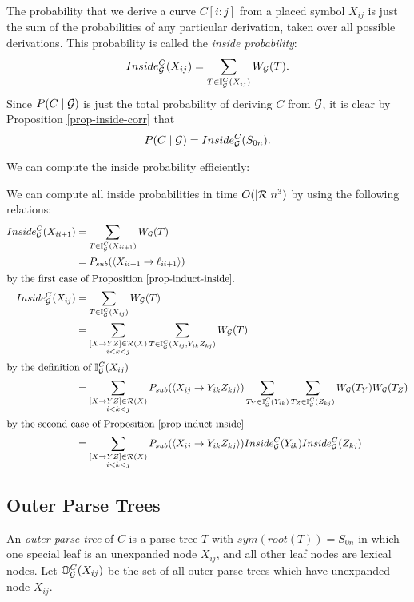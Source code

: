 \documentclass{article}
\newcommand\Inner{\mathbb{I}}
\newcommand\Outer{\mathbb{O}}
\begin{document}
The probability that we derive a curve $C[i:j]$ from a placed symbol
$X_{ij}$ is just the sum of the probabilities of any particular
derivation, taken over all possible derivations. This probability is
called the \emph{inside probability}:
$$Inside_\GGG^C(X_{i j}) =  \sum_{T\in \Inner_\GGG^C(X_{ij})}W_\GGG(T).$$
Since $P(C\mid {\mathcal G})$ is just the total probability of deriving $C$
from ${\mathcal G}$, it is clear by Proposition \ref{prop-inside-corr} that 
$$P(C\mid {\mathcal G}) = Inside_{{\mathcal G}}^C(S_{0 n}).$$

We can compute the inside probability efficiently:

\begin{obs}
\label{obs-inside-rec}
We can compute all inside probabilities in time $O(|{\mathcal R}|n^3)$ by using the
following relations:
  \begin{align*}
Inside_\GGG^C(X_{i i+1}) &= \sum_{T\in \Inner_\GGG^C(X_{i i+1})}
W_\GGG(T)\\
 &= P_{sub}(\langle X_{i i+1} \to \ell_{i i+1} \rangle) \\
\intertext{by the first case of Proposition \ref{prop-induct-inside}.}
Inside_\GGG^C(X_{ij}) &= \sum_{T\in \Inner_\GGG^C(X_{ij})} W_\GGG(T)\\
&= \sum_{\substack{[X\to YZ] \in \RRR(X)\\ i < k < j}} \sum_{T\in
  \Inner_\GGG^C(X_{ij}, Y_{ik}Z_{kj})} W_\GGG(T)\\
\intertext{by the definition of $\Inner_\GGG^C(X_{ij})$}
&= \sum_{\substack{[X\to YZ] \in \RRR(X)\\ i < k < j}} 
P_{sub}(\langle X_{ij} \to Y_{ik} Z_{kj} \rangle)
\sum_{T_Y\in \Inner_\GGG^C(Y_{ik})}
\sum_{T_Z\in \Inner_\GGG^C(Z_{kj})}
 W_\GGG(T_Y) W_\GGG(T_Z)\\
\intertext{by the second case of Proposition \ref{prop-induct-inside}}
&= \sum_{\substack{[X\to YZ] \in \RRR(X)\\ i < k < j}} 
P_{sub}(\langle  X_{ij} \to Y_{ik} Z_{kj} \rangle)
Inside_\GGG^C(Y_{ik})
Inside_\GGG^C(Z_{kj})
  \end{align*}
\end{obs}

\subsection{Outer Parse Trees}

\begin{defn}
  An \emph{outer parse tree} of $C$ is a parse tree $T$ with
  $sym(root(T)) = S_{0n}$ in which one special leaf is an unexpanded node
  $X_{ij}$, and all other leaf nodes are lexical nodes. Let
  $\Outer_\GGG^C(X_{ij})$ be the set of all outer parse trees which
  have unexpanded node $X_{ij}$.
\end{defn}
\end{document}
